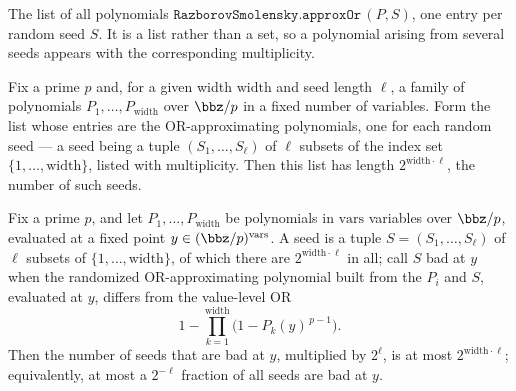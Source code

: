 \begin{definition}
\label{RazborovSmolensky.approxOrPolyList}
\leanok
{}
The list of all polynomials $\texttt{RazborovSmolensky.approxOr}\,(P,S)$, one entry per random seed $S$. It
is a list rather than a set, so a polynomial arising from several seeds appears with the
corresponding multiplicity.
\end{definition}

\begin{lemma}
\label{RazborovSmolensky.approxOrPolyList_length}
\leanok
{}
Fix a prime $p$ and, for a given width $\mathrm{width}$ and seed length $\ell$, a family
of polynomials $P_1,\dots,P_{\mathrm{width}}$ over $\bbz/p$ in a fixed number of
variables. Form the list whose entries are the OR-approximating polynomials, one for
each random seed — a seed being a tuple $(S_1,\dots,S_\ell)$ of $\ell$ subsets of the
index set $\{1,\dots,\mathrm{width}\}$, listed with multiplicity. Then this list has
length $2^{\mathrm{width}\cdot\ell}$, the number of such seeds.
\end{lemma}

\begin{theorem}
\label{RazborovSmolensky.approxOr_pointwise_bad_count}
\leanok
{}
Fix a prime $p$, and let $P_1,\dots,P_{\mathrm{width}}$ be polynomials in
$\mathrm{vars}$ variables over $\bbz/p$, evaluated at a fixed point $y \in
(\bbz/p)^{\mathrm{vars}}$. A seed is a tuple $S = (S_1,\dots,S_\ell)$ of $\ell$ subsets
of $\{1,\dots,\mathrm{width}\}$, of which there are $2^{\mathrm{width}\cdot\ell}$ in
all; call $S$ bad at $y$ when the randomized OR-approximating polynomial built from the
$P_i$ and $S$, evaluated at $y$, differs from the value-level OR
\[
1 - \prod_{k=1}^{\mathrm{width}}\bigl(1 - P_k(y)^{\,p-1}\bigr).
\]
Then the number of seeds that are bad at $y$, multiplied by $2^\ell$, is at most
$2^{\mathrm{width}\cdot\ell}$; equivalently, at most a $2^{-\ell}$ fraction of all seeds
are bad at $y$.
\end{theorem}

